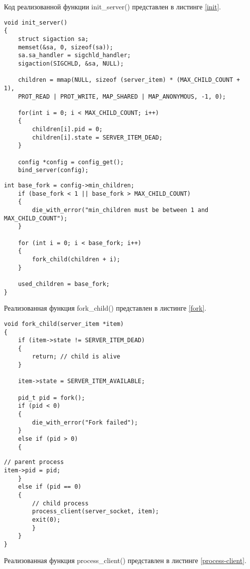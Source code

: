 Код реализованной функции init\_server() представлен в листинге \ref{init}.

\begin{lstlisting}[caption={Реализация функции init\_server()}, label=init]
void init_server()
{
	struct sigaction sa;
	memset(&sa, 0, sizeof(sa));
	sa.sa_handler = sigchld_handler;
	sigaction(SIGCHLD, &sa, NULL);
	
	children = mmap(NULL, sizeof (server_item) * (MAX_CHILD_COUNT + 1),
	PROT_READ | PROT_WRITE, MAP_SHARED | MAP_ANONYMOUS, -1, 0);
	
	for(int i = 0; i < MAX_CHILD_COUNT; i++)
	{
		children[i].pid = 0;
		children[i].state = SERVER_ITEM_DEAD;
	}
	
	config *config = config_get();
	bind_server(config);
\end{lstlisting}

\begin{lstlisting}[title={Окончание листинга \ref{init}}, label=init1, firstnumber=19]
	int base_fork = config->min_children;
	if (base_fork < 1 || base_fork > MAX_CHILD_COUNT)
	{
		die_with_error("min_children must be between 1 and MAX_CHILD_COUNT");
	}

	for (int i = 0; i < base_fork; i++)
	{
		fork_child(children + i);
	}

	used_children = base_fork;
}
\end{lstlisting}

Реализованная функция fork\_child() представлен в листинге \ref{fork}.

\begin{lstlisting}[caption={Реализация функции init\_server()}, label=fork]
void fork_child(server_item *item)
{
	if (item->state != SERVER_ITEM_DEAD)
	{
		return; // child is alive
	}
	
	item->state = SERVER_ITEM_AVAILABLE;
	
	pid_t pid = fork();
	if (pid < 0)
	{
		die_with_error("Fork failed");
	}
	else if (pid > 0)
	{
\end{lstlisting}

\begin{lstlisting}[title={Окончание листинга \ref{fork}}, label=fork1, firstnumber=17]
// parent process
item->pid = pid;
	}
	else if (pid == 0)
	{
		// child process
		process_client(server_socket, item);
		exit(0);
		}
	}
}
\end{lstlisting}

Реализованная функция process\_client() представлен в листинге \ref{process-client}.

